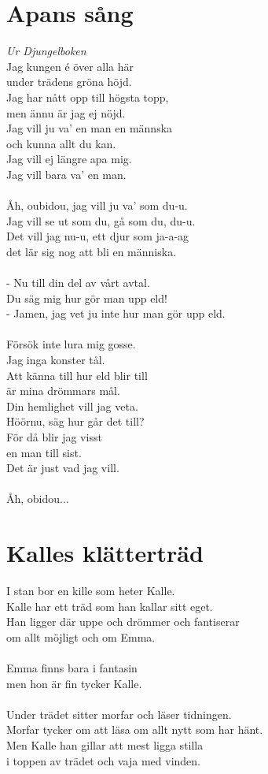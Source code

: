 \section{Apans sång}
\textit{Ur Djungelboken}
\vspace{2mm}\\
Jag kungen é över alla här\\
under trädens gröna höjd.\\
Jag har nått opp till högsta topp,\\
men ännu är jag ej nöjd.\\
Jag vill ju va' en man en männska\\
och kunna allt du kan.\\
Jag vill ej längre apa mig.\\
Jag vill bara va' en man.\\
\\
Åh, oubidou, jag vill ju va' som du-u.\\
Jag vill se ut som du, gå som du, du-u.\\
Det vill jag nu-u, ett djur som ja-a-ag\\
det lär sig nog att bli en människa.\\
\\
- Nu till din del av vårt avtal.\\
Du säg mig hur gör man upp eld!\\
- Jamen, jag vet ju inte hur man gör upp eld.\\
\\
Försök inte lura mig gosse.\\
Jag inga konster tål.\\
Att känna till hur eld blir till\\
är mina drömmars mål.\\
Din hemlighet vill jag veta.\\
Höörnu, säg hur går det till?\\
För då blir jag visst\\
en man till sist.\\
Det är just vad jag vill.\\
\\
Åh, obidou...

\section{Kalles klätterträd}
I stan bor en kille som heter Kalle.\\
Kalle har ett träd som han kallar sitt eget.\\
Han ligger där uppe och drömmer och fantiserar\\
om allt möjligt och om Emma.\\
\\
Emma finns bara i fantasin \\
men hon är fin tycker Kalle.\\
\\
Under trädet sitter morfar och läser tidningen.\\
Morfar tycker om att läsa om allt nytt som har hänt.\\
Men Kalle han gillar att mest ligga stilla\\
i toppen av trädet och vaja med vinden.


